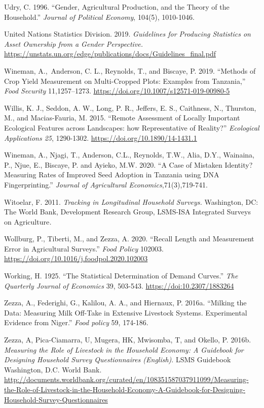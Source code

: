 \documentclass[
]{book}
\begin{document}
Udry, C. 1996. ``Gender, Agricultural Production, and the Theory of the Household.'' \emph{Journal of Political Economy}, 104(5), 1010-1046.

United Nations Statistics Division. 2019. \emph{Guidelines for Producing Statistics on Asset Ownership from a Gender Perspective.} \url{https://unstats.un.org/edge/publications/docs/Guidelines_final.pdf}

Wineman, A.,~Anderson, C. L., Reynolds, T., and Biscaye, P. 2019. ``Methods of Crop Yield Measurement on Multi-Cropped Plots: Examples from Tanzania,'' \emph{Food Security} 11,1257--1273. \url{https://doi.org/10.1007/s12571-019-00980-5}

Willis, K. J., Seddon, A. W., Long, P. R., Jeffers, E. S., Caithness, N., Thurston, M., and Macias-Fauria, M. 2015. ``Remote Assessment of Locally Important Ecological Features across Landscapes: how Representative of Reality?'' \emph{Ecological Applications 25}, 1290-1302. \url{https://doi.org/10.1890/14-1431.1}

Wineman, A., Njagi, T., Anderson, C.L., Reynolds, T.W., Alia, D.Y., Wainaina, P., Njue, E., Biscaye, P. and Ayieko, M.W. 2020. ``A Case of Mistaken Identity? Measuring Rates of Improved Seed Adoption in Tanzania using DNA Fingerprinting.'' \emph{Journal of Agricultural Economics},71(3),719-741.

Witoelar, F. 2011. \emph{Tracking in Longitudinal Household Surveys.} Washington, DC: The World Bank, Development Research Group, LSMS-ISA Integrated Surveys on Agriculture\emph{.}

Wollburg, P., Tiberti, M., and Zezza, A. 2020. ``Recall Length and Measurement Error in Agricultural Surveys.'' \emph{Food Policy} 102003. \url{https://doi.org/10.1016/j.foodpol.2020.102003}

Working, H. 1925. ``The Statistical Determination of Demand Curves.'' \emph{The Quarterly Journal of Economics} 39, 503-543. \url{https://doi:10.2307/1883264}

Zezza, A., Federighi, G., Kalilou, A. A., and Hiernaux, P. 2016a. ``Milking the Data: Measuring Milk Off-Take in Extensive Livestock Systems. Experimental Evidence from Niger.'' \emph{Food policy} 59, 174-186.

Zezza, A, Pica-Ciamarra, U, Mugera, HK, Mwisomba, T, and Okello, P. 2016b. \emph{Measuring the Role of Livestock in the Household Economy: A Guidebook for Designing Household Survey Questionnaires (English)}. LSMS Guidebook Washington, D.C. World Bank. \url{http://documents.worldbank.org/curated/en/108351587037911099/Measuring-the-Role-of-Livestock-in-the-Household-Economy-A-Guidebook-for-Designing-Household-Survey-Questionnaires}
\end{document}

